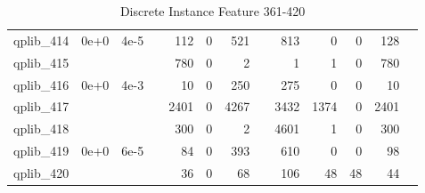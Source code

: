 \begin{table}
\begin{tabular}{lrrrrrrrrrrrr}
qplib\_414	&	0e+0	&	4e-5	&	&	112	&	0	&	521	&	&	813	&	0	&	0	&	128	\\
qplib\_415	&		&		&	&	780	&	0	&	2	&	&	1	&	1	&	0	&	780	\\
qplib\_416	&	0e+0	&	4e-3	&	&	10	&	0	&	250	&	&	275	&	0	&	0	&	10	\\
qplib\_417	&		&		&	&	2401	&	0	&	4267	&	&	3432	&	1374	&	0	&	2401	\\
qplib\_418	&		&		&	&	300	&	0	&	2	&	&	4601	&	1	&	0	&	300	\\
qplib\_419	&	0e+0	&	6e-5	&	&	84	&	0	&	393	&	&	610	&	0	&	0	&	98	\\
qplib\_420	&		&		&	&	36	&	0	&	68	&	&	106	&	48	&	48	&	44	\\
							


\bottomrule

\end{tabular}  
\label{tab:A7}
\caption{Discrete  Instance Feature 361-420} 

\end{table}

